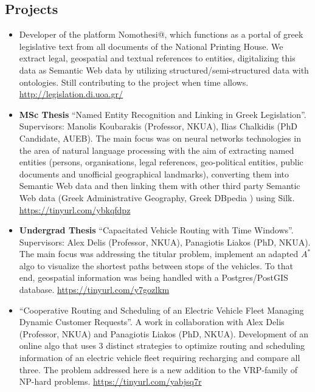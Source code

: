 \documentclass[a4paper,oneside,10pt]{article}
\begin{document}
\subsection*{Projects}

\begin{itemize}

\item Developer of the platform Nomothesi@, which functions as a portal of greek legislative text from all documents of the National Printing House. We extract legal, geospatial and textual references to entities, digitalizing this data as Semantic Web data by utilizing structured/semi-structured data with ontologies. Still contributing to the project when time allows. \url{http://legislation.di.uoa.gr/}

\item \begin{sloppypar}
\textbf{MSc Thesis} ``Named Entity Recognition and Linking in Greek Legislation''. Supervisors: Manolis Koubarakis (Professor, NKUA), Ilias Chalkidis (PhD Candidate, AUEB).
The main focus was on neural networks technologies in the area of natural language processing with the aim of extracting named entities (persons, organisations, legal references, geo-political entities, public documents and unofficial geographical landmarks), 
converting them into Semantic Web data and then linking them with other third party Semantic Web data (Greek Administrative Geography, Greek DBpedia ) using Silk. \url{https://tinyurl.com/ybkqfdpz}

\end{sloppypar}

\item \begin{sloppypar}
\textbf{Undergrad Thesis} ``Capacitated Vehicle Routing with Time Windows''. Supervisors: Alex Delis (Professor, NKUA), Panagiotis Liakos (PhD, NKUA). 
The main focus was addressing the titular problem, implement an adapted $A^{*}$ algo to visualize the shortest paths between stops of the vehicles. To that end, geospatial information was being handled with a Postgres/PostGIS database. \url{https://tinyurl.com/y7gozlkm}

\end{sloppypar}

\item \begin{sloppypar}
``Cooperative Routing and Scheduling of an Electric Vehicle Fleet Managing Dynamic Customer Requests''. A work in collaboration with Alex Delis (Professor, NKUA) and Panagiotis Liakos (PhD, NKUA). 
Development of an online algo that uses 3 distinct strategies to optimize routing and scheduling information of an electric vehicle fleet requiring recharging and compare all three. The problem addressed here is a new addition to the VRP-family of NP-hard problems. \url{https://tinyurl.com/yabjsq7r}


\end{sloppypar}
\end{itemize}
\end{document}
